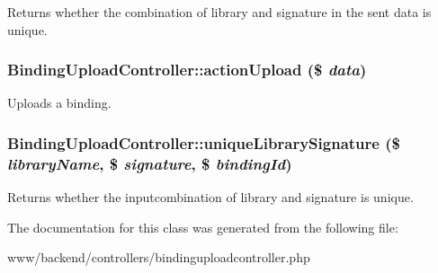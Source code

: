 Returns whether the combination of library and signature in the sent data is unique. \hypertarget{classBindingUploadController_a00a73d1273ff14289fb98301da75530c}{
\subsubsection[{actionUpload}]{\setlength{\rightskip}{0pt plus 5cm}BindingUploadController::actionUpload (\$ {\em data})}}
\label{classBindingUploadController_a00a73d1273ff14289fb98301da75530c}
Uploads a binding. \hypertarget{classBindingUploadController_a7fbce3810bafb07dd69b1636ca49834a}{
\subsubsection[{uniqueLibrarySignature}]{\setlength{\rightskip}{0pt plus 5cm}BindingUploadController::uniqueLibrarySignature (\$ {\em libraryName}, \/  \$ {\em signature}, \/  \$ {\em bindingId})}}
\label{classBindingUploadController_a7fbce3810bafb07dd69b1636ca49834a}
Returns whether the inputcombination of library and signature is unique. 

The documentation for this class was generated from the following file:\begin{DoxyCompactItemize}
\item 
www/backend/controllers/bindinguploadcontroller.php\end{DoxyCompactItemize}

